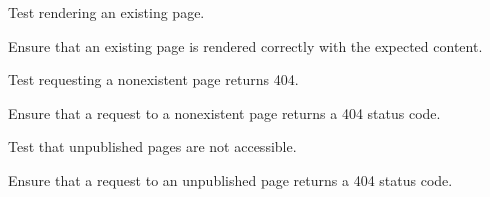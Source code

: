 \documentclass[letterpaper,10pt,english]{sphinxmanual}
\begin{document}
\begin{fulllineitems}
\begin{fulllineitems}
\end{fulllineitems}


\begin{fulllineitems}
\label{\detokenize{pages_app.tests:pages_app.tests.test_views.ViewTests.test_render_page_existing_page}}
\pysigstartsignatures
\pysiglinewithargsret
{}
{}
{}
\pysigstopsignatures
\sphinxAtStartPar
Test rendering an existing page.

\sphinxAtStartPar
Ensure that an existing page is rendered correctly with the expected content.

\end{fulllineitems}


\begin{fulllineitems}
\label{\detokenize{pages_app.tests:pages_app.tests.test_views.ViewTests.test_render_page_nonexistent_page}}
\pysigstartsignatures
\pysiglinewithargsret
{}
{}
{}
\pysigstopsignatures
\sphinxAtStartPar
Test requesting a non\sphinxhyphen{}existent page returns 404.

\sphinxAtStartPar
Ensure that a request to a non\sphinxhyphen{}existent page returns a 404 status code.

\end{fulllineitems}


\begin{fulllineitems}
\label{\detokenize{pages_app.tests:pages_app.tests.test_views.ViewTests.test_render_page_unpublished_page}}
\pysigstartsignatures
\pysiglinewithargsret
{}
{}
{}
\pysigstopsignatures
\sphinxAtStartPar
Test that unpublished pages are not accessible.

\sphinxAtStartPar
Ensure that a request to an unpublished page returns a 404 status code.

\end{fulllineitems}


\end{fulllineitems}
\end{document}
